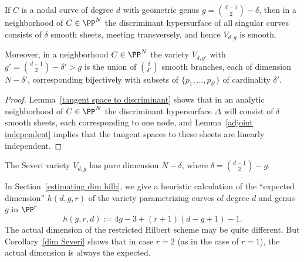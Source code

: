 \begin{corollary}\label{local geometry of Severi}
If $C$ is a nodal curve of degree $d$ with geometric genus $g = \binom{d-1}{2}-\delta$, then in a neighborhood of $C\in \PP^N$
the discriminant hypersurface of all singular curves consists of $\delta$ smooth sheets, meeting transversely, and hence
$V_{d,g}$ is smooth. 

Moreover, in a neighborhood  $C \in \PP^N$ 
the variety $\overline V_{d,g'}$ with $g' =  \binom{d-1}{2}-\delta' > g$ is the union of $\binom{\delta}{\delta'}$ smooth branches, each of dimension $N - \delta'$, corresponding bijectively with subsets of $\{p_1,\dots,p_{\delta'}\}$ of cardinality $\delta'$.
\end{corollary}
\begin{proof}
Lemma~\ref{tangent space to discriminant} shows that in an analytic neighborhood of $C\in \PP^N$ the discriminant hypersurface $\Delta$ will consist of $\delta$ smooth sheets, each corresponding to one node, and Lemma~\ref{adjoint independent} implies that the tangent spaces to these sheets are linearly independent. 
\end{proof}


\begin{corollary}\label{dim Severi}
The  Severi variety $V_{d,g}$ has pure dimension $N - \delta$, where $\delta = \binom{d-1}{2} - g$.
\end{corollary}

In Section~\ref{estimating dim hilb}, we give a heuristic calculation of the ``expected dimension'' $h(d,g,r)$ of the variety parametrizing curves of degree $d$ and genus $g$ in $\PP^r$
$$
h(g,r,d) := 4g-3 + (r+1)(d-g+1) - 1.
$$
The actual dimension of the restricted Hilbert scheme may be quite different. But  Corollary~\ref{dim Severi} shows that in case $r=2$ (as in the case of $r=1$), the actual dimension is always the expected.


%


